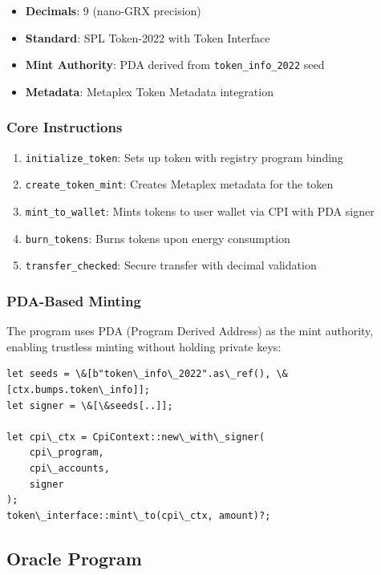 \documentclass[conference]{IEEEtran}
\begin{document}
{\begin{itemize}
    \item \textbf{Decimals}: 9 (nano-GRX precision)
    \item \textbf{Standard}: SPL Token-2022 with Token Interface
    \item \textbf{Mint Authority}: PDA derived from \texttt{token\_info\_2022} seed
    \item \textbf{Metadata}: Metaplex Token Metadata integration
\end{itemize}

\subsubsection{Core Instructions}

\begin{enumerate}
    \item \texttt{initialize\_token}: Sets up token with registry program binding
    \item \texttt{create\_token\_mint}: Creates Metaplex metadata for the token
    \item \texttt{mint\_to\_wallet}: Mints tokens to user wallet via CPI with PDA signer
    \item \texttt{burn\_tokens}: Burns tokens upon energy consumption
    \item \texttt{transfer\_checked}: Secure transfer with decimal validation
\end{enumerate}

\subsubsection{PDA-Based Minting}

The program uses PDA (Program Derived Address) as the mint authority, enabling trustless minting without holding private keys:

\begin{lstlisting}[caption={PDA Signer for Token Minting}]
let seeds = \&[b"token\_info\_2022".as\_ref(), \&[ctx.bumps.token\_info]];
let signer = \&[\&seeds[..]];

let cpi\_ctx = CpiContext::new\_with\_signer(
    cpi\_program, 
    cpi\_accounts, 
    signer
);
token\_interface::mint\_to(cpi\_ctx, amount)?;
\end{lstlisting}

\subsection{Oracle Program}

}
\end{document}
